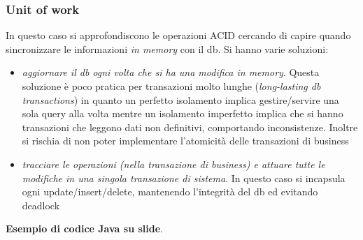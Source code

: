\documentclass[a4paper,12pt, oneside]{book}
\begin{document}
\subsubsection{Unit of work}
In questo caso si approfondiscono le operazioni ACID cercando di capire quando
sincronizzare le informazioni \textit{in memory} con il db. Si hanno varie
soluzioni:
\begin{itemize}
  \item \textit{aggiornare il db ogni volta che si ha una modifica in
    memory}. Questa soluzione è poco pratica per transazioni molto lunghe
  (\textit{long-lasting db transactions}) in quanto un perfetto isolamento
  implica gestire/servire una sola query alla volta mentre un isolamento
  imperfetto implica che si hanno transazioni che leggono dati non definitivi,
  comportando inconsistenze. Inoltre si rischia di non poter implementare
  l'atomicità delle transazioni di business
  \item \textit{tracciare le operazioni (nella transazione di business) e
    attuare tutte le modifiche in una singola transazione di sistema}. In questo
  caso si incapsula ogni update/insert/delete, mantenendo l'integrità del db ed
  evitando deadlock
\end{itemize}
\textbf{Esempio di codice Java su slide}.\\
\end{document}
